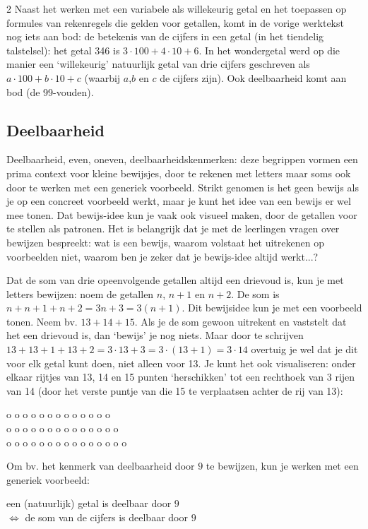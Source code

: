 \begin{multicols}{2}
Naast het werken met een variabele als willekeurig getal en het toepassen op formules van rekenregels die gelden voor getallen, komt in de vorige werktekst nog iets aan bod: de betekenis van de cijfers in een getal (in het tiendelig talstelsel): het getal 346 is $3\cdot 100+4\cdot 10+6$. In het wondergetal werd op die manier een ‘willekeurig’ natuurlijk getal van drie cijfers geschreven als $a\cdot 100+b\cdot 10+c$ (waarbij $a$,$b$ en $c$ de cijfers zijn). Ook deelbaarheid komt aan bod (de 99-vouden).

\subsection{Deelbaarheid}

Deelbaarheid, even, oneven, deelbaarheidskenmerken: deze begrippen vormen een prima context voor kleine bewijsjes, door te rekenen met letters maar soms ook door te werken met een generiek voorbeeld. Strikt genomen is het geen bewijs als je op een concreet voorbeeld werkt, maar je kunt het idee van een bewijs er wel mee tonen. Dat bewijs-idee kun je vaak ook visueel maken, door de getallen voor te stellen als patronen. Het is belangrijk dat je met de leerlingen vragen over bewijzen bespreekt: wat is een bewijs, waarom volstaat het uitrekenen op voorbeelden niet, waarom ben je zeker dat je bewijs-idee altijd werkt...?

Dat de som van drie opeenvolgende getallen altijd een drievoud is, kun je met letters bewijzen: noem de getallen $n$, $n+1$ en $n+2$. De som is $n+n+1+n+2=3n+3=3(n+1)$. Dit bewijsidee kun je met een voorbeeld tonen. Neem bv. $13+14+15$. Als je de som gewoon uitrekent en vaststelt dat het een drievoud is, dan `bewijs' je nog niets. Maar door te schrijven $13+13+1+13+2=3\cdot 13+3=3\cdot (13+1)=3\cdot 14$ overtuig je wel dat je dit voor elk getal kunt doen, niet alleen voor 13. Je kunt het ook visualiseren: onder elkaar rijtjes van 13, 14 en 15 punten `herschikken' tot een rechthoek van 3 rijen van 14 (door het verste puntje van die 15 te verplaatsen achter de rij van 13):

o  o  o  o  o  o  o  o  o  o  o  o  o\\
o  o  o  o  o  o  o  o  o  o  o  o  o  o\\
o  o  o  o  o  o  o  o  o  o  o  o  o  o  o

Om bv. het kenmerk van deelbaarheid door $9$ te bewijzen, kun je werken met een generiek voorbeeld:  
\begin{center}
een (natuurlijk) getal is deelbaar door $9$\\ $\Leftrightarrow$ de som van de cijfers is deelbaar door $9$
\end{center}


\end{multicols}
